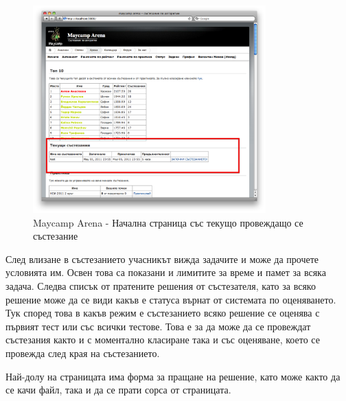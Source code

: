 \documentclass[a4paper,12pt]{article}
\begin{document}
  \begin{figure}[ht]
    \begin{center}
      \includegraphics[width=0.8\textwidth]{maycamp_arena_home_contest.png}
    \end{center}
    \caption{Maycamp Arena - Начална страница със текущо провеждащо се състезание}
    \label{arena_homepage_contest}
  \end{figure}
  
  След влизане в състезанието учасникът вижда задачите и може да прочете условията им. Освен това са показани и лимитите за време и памет за всяка задача. Следва списък от пратените решения от състезателя, като за всяко решение може да се види какъв е статуса върнат от системата по оценяването. Тук според това в какъв режим е състезанието всяко решение се оценява с първият тест или със всички тестове. Това е за да може да се провеждат състезания както и с моментално класиране така и със оценяване, което се провежда след края на състезанието.
  
  Най-долу на страницата има форма за пращане на решение, като може както да се качи файл, така и да се прати сорса от страницата.
\end{document}

